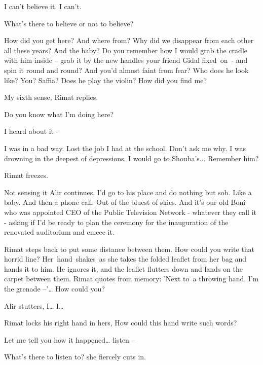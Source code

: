 \documentclass[twoside,11pt]{book}
\begin{document}
{\textquotedbl}I can't believe it. I can't.{\textquotedbl} 

{\textquotedbl}What's there to believe or not to believe?{\textquotedbl} 

{\textquotedbl}How did you get here? And where from? Why did we disappear from each other all these years? And the baby?
Do you remember how I would grab the cradle with him inside -- grab it by the new handles your friend Gidal
fixed{\ }on{\ }{}-
and spin it round and round? And you'd almost faint from fear? Who does he look like? You? Saffia? Does he play the
violin? How did you find me?{\textquotedbl}\ 

{\textquotedbl}My sixth sense,{\textquotedbl} Rimat replies. 

{\textquotedbl}Do you know what I'm doing here?{\textquotedbl} 

{\textquotedbl}I heard about it -{\textquotedbl}

{\textquotedbl}I was in a bad way. Lost the job I had at the school. Don't ask me why. I was drowning in the deepest of
depressions. I would go to Shouba's... Remember him?{\textquotedbl}

Rimat freezes.

Not sensing it Alir continues, {\textquotedbl}I'd go to his place and do nothing but sob. Like a baby. And then a phone
call. Out of the bluest of skies. And it's our old Boni who was appointed CEO of the Public Television Network -
whatever they call it - asking if I'd be ready to plan the ceremony for the inauguration of the renovated auditorium
and emcee it.{\textquotedbl} 

Rimat steps back to put some distance between them. {\textquotedbl}How could you write that horrid line?{\textquotedbl}
Her\ hand\ shakes\ as she takes the folded leaflet from her bag and hands it to him. He ignores it, and the leaflet
flutters down and lands on the carpet between them. Rimat quotes from memory: {\textquotedbl}'Next to~a throwing hand,
I'm the grenade --'{\dots} How could you?{\textquotedbl} 

Alir stutters, {\textquotedbl}I{\dots} I{\dots}{\textquotedbl} 

Rimat locks his right hand in hers, {\textquotedbl}How could this hand write such words?{\textquotedbl} 

{\textquotedbl}Let me tell you how it happened{\dots} listen -- {\textquotedbl} 

{\textquotedbl}What's there to listen to?{\textquotedbl} she fiercely cuts in.
\end{document}
